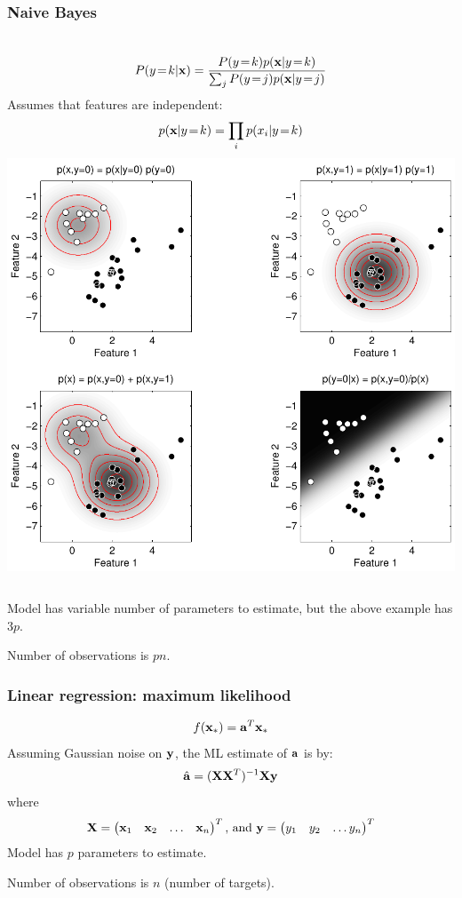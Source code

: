 \begin{frame}
\frametitle{Naive Bayes}
\begin{columns}[c]
\begin{align*}
P(y\!=\!k|{\bf x}) = \frac{P(y\!=\!k) p({\bf x}|y\!=\!k)}{\sum_j P(y\!=\!j) p({\bf x}|y\!=\!j)}\cr
\end{align*}
Assumes that features are independent:
\begin{align*}
p({\bf x}|y\!=\!k) = \prod_i p(x_i|y\!=\!k)
\end{align*}
\includegraphics[width=\textwidth]{simple_naive_bayes}
\end{columns}
Model has variable number of parameters to estimate, but the above example has $3p$.\par
Number of observations is $pn$.
\end{frame}

\begin{frame}
\frametitle{Linear regression: maximum likelihood}
\begin{align*}
f({\bf x}_*) = {\bf a}^T {\bf x}_*
\end{align*}
Assuming Gaussian noise on ${\bf y}$, the ML estimate of ${\bf a}$ is by:
\begin{align*}
\hat{\bf a} = ({\bf X}{\bf X}^T)^{-1}{\bf X} {\bf y}
\end{align*}
where
\begin{align*}
{\bf X} = \begin{pmatrix}{\bf x}_1 & {\bf x}_2 & \hdots & {\bf x}_n\end{pmatrix}^T \text{, and }
{\bf y} = \begin{pmatrix}y_1 & y_2 & \hdots y_n\end{pmatrix}^T
\end{align*}
Model has $p$ parameters to estimate.\par
Number of observations is $n$ (number of targets).
\end{frame}

